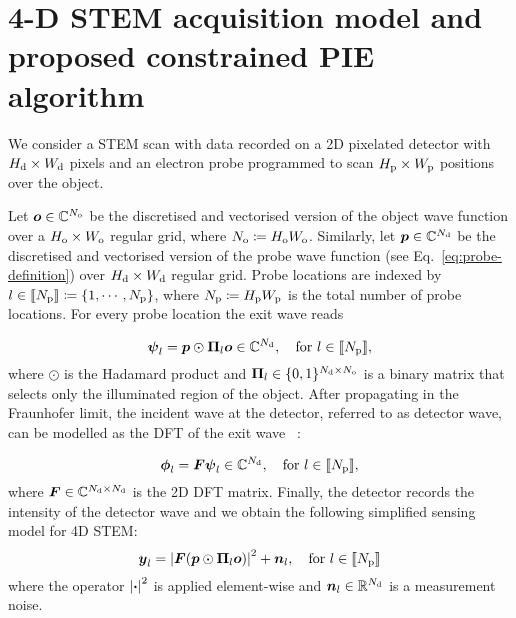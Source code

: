 \documentclass[11pt,draftclsnofoot,onecolumn]{IEEEtran}
\begin{document}
\section{4-D STEM acquisition model and proposed constrained PIE algorithm}\label{sec:4d-stem}

We consider a STEM scan with data recorded on a 2D pixelated detector with $H_{\rm d} \times W_{\rm d}$ pixels and an electron probe programmed to scan $H_{\rm p} \times W_{\rm p}$ positions over the object.

Let $\boldsymbol o \in \mathbb C^{N_{\rm o}}$ be the discretised and vectorised version of the object wave function over a $H_{\rm o} \times W_{\rm o}$ regular grid, where $N_{\rm o} \coloneqq H_{\rm o}W_{\rm o}$. Similarly, let $\boldsymbol p \in \mathbb C^{N_{\rm d}}$ be the discretised and vectorised version of the probe wave function (see Eq.~\ref{eq:probe-definition}) over $H_{\rm d} \times W_{\rm d}$ regular grid. Probe locations are indexed by $l \in \llbracket N_{\rm p} \rrbracket \coloneqq \{1,\cdots, N_{\rm p}\}$, where $N_{\rm p} \coloneqq H_{\rm p} W_{\rm p}$ is the total number of probe locations.
For every probe location the exit wave reads

\begin{equation}\label{eq:exit-wave-equation}
    \boldsymbol \psi_l = \boldsymbol p \odot \boldsymbol \Pi_l \boldsymbol o \in \mathbb C^{N_{\rm d}}, \quad {\rm for~} l \in \llbracket N_{\rm p} \rrbracket,
\end{equation}
where $\odot$ is the Hadamard product and $\boldsymbol \Pi_{l} \in \{0,1\}^{N_{\rm d}\times N_{\rm o}}$ is a binary matrix that selects only the illuminated region of the object. After propagating in the Fraunhofer limit, the incident wave at the detector, \ie referred to as detector wave,  can be modelled as the DFT of the exit wave ~\cite{hawkes2019springer}:

\begin{equation}\label{eq:detector-wave-equation}
    \boldsymbol \phi_l = \boldsymbol F \boldsymbol \psi_l \in \mathbb C^{N_{\rm d}}, \quad {\rm for~} l \in \llbracket N_{\rm p} \rrbracket,
\end{equation}
where $\boldsymbol F \in \mathbb C^{N_{\rm d} \times N_{\rm d}}$ is the 2D DFT matrix. Finally, the detector records the intensity of the detector wave and we obtain the following simplified sensing model for 4D STEM: 
\begin{equation}\label{eq:4d-stem-equation}
\boldsymbol y_l = 
    \left|\boldsymbol F (\boldsymbol p \odot \boldsymbol \Pi_l \boldsymbol o) \right|^2 + \boldsymbol n_l, \quad {\rm for~} l \in \llbracket N_{\rm p} \rrbracket
\end{equation}
where the operator $\left|\boldsymbol \cdot \right|^2$ is applied element-wise and $\boldsymbol n_l \in \mathbb R^{N_{\rm d}}$ is a measurement noise. 
\end{document}

